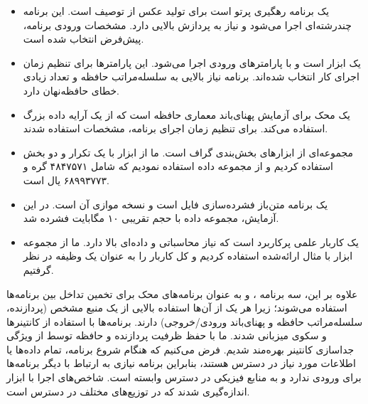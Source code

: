 \begin{itemize}
\item
{} \cite{povray2018} یک برنامه رهگیری پرتو است برای تولید عکس از توصیف است. این برنامه چندرشته‌ای اجرا می‌شود و نیاز به پردازش بالایی دارد. مشخصات ورودی برنامه، پیش‌فرض انتخاب شده است.
\item
{} \cite{iozone2018} یک ابزار  است و با پارامترهای ورودی  اجرا می‌شود. این پارامترها برای تنظیم زمان اجرای کار انتخاب شده‌اند. برنامه نیاز بالایی به سلسله‌مراتب حافظه و تعداد زیادی خطای حافظه‌نهان دارد.
\item
{} \cite{mccalpin2006stream} یک محک برای آزمایش پهنای‌باند معماری حافظه است که از یک آرایه داده بزرگ استفاده می‌کند. برای تنظیم زمان اجرای برنامه، مشخصات  استفاده شدند.
\item
{} \cite{karypis2009metis} مجموعه‌ای از ابزارهای بخش‌بندی گراف است. ما از ابزار  با یک تکرار و دو بخش استفاده کردیم و از مجموعه داده  استفاده نمودیم که شامل ۴۸۴۷۵۷۱ گره و ۶۸۹۹۳۷۷۳ یال است.
\item
{} یک برنامه متن‌باز فشرده‌سازی فایل است و  نسخه موازی آن است. در این آزمایش، مجموعه داده  با حجم تقریبی ۱۰ مگابایت فشرده شد.
\item
{} یک کاربار علمی پرکاربرد است که نیاز محاسباتی و داده‌ای بالا دارد. ما از مجموعه ابزار  با مثال ارائه‌شده  استفاده کردیم و کل کاربار  را به عنوان یک وظیفه در نظر گرفتیم.
\end{itemize}

علاوه بر این، سه برنامه ،  و  به عنوان برنامه‌های محک برای تخمین تداخل بین برنامه‌ها استفاده می‌شوند؛ زیرا هر یک از آن‌ها استفاده بالایی از یک منبع مشخص (پردازنده، سلسله‌مراتب حافظه و پهنای‌باند ورودی/خروجی) دارند. برنامه‌ها با استفاده از کانتینرها و سکوی  میزبانی شدند. ما با حفظ ظرفیت پردازنده و حافظه توسط  از ویژگی جداسازی کانتینر بهره‌مند شدیم. فرض می‌کنیم که هنگام شروع برنامه، تمام داده‌ها یا اطلاعات مورد نیاز در دسترس هستند، بنابراین برنامه نیازی به ارتباط با دیگر برنامه‌ها برای ورودی ندارد و به منابع فیزیکی در دسترس وابسته است. شاخص‌های اجرا با ابزار  \cite{linux2018perf} اندازه‌گیری شدند که در توزیع‌های مختلف  در دسترس است.

